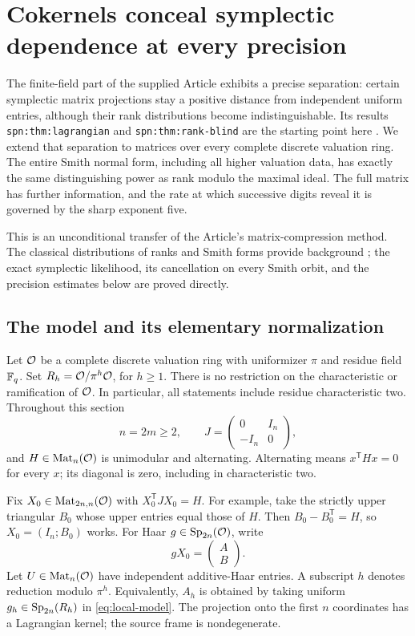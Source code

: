 \section{Cokernels conceal symplectic dependence at every precision}
\label{sec:local}

The finite-field part of the supplied Article exhibits a precise separation:
certain symplectic matrix projections stay a positive distance from independent
uniform entries, although their rank distributions become indistinguishable.
Its results \texttt{spn:thm:lagrangian} and
\texttt{spn:thm:rank-blind} are the starting point here
\cite{ProveItArticle}. We extend that separation to matrices over every complete
discrete valuation ring. The entire Smith normal form, including all higher
valuation data, has exactly the same distinguishing power as rank modulo the
maximal ideal. The full matrix has further information, and the rate at which
successive digits reveal it is governed by the sharp exponent five.

This is an unconditional transfer of the Article's matrix-compression method.
The classical distributions of ranks and Smith forms provide background
\cite{FulmanGoldstein,WangStanley}; the exact symplectic likelihood, its
cancellation on every Smith orbit, and the precision estimates below are
proved directly.

\subsection{The model and its elementary normalization}

Let \(\mathcal O\) be a complete discrete valuation ring with uniformizer \(\pi\) and
residue field \(\mathbb F_q\). Set \(R_h=\mathcal O/\pi^h\mathcal O\), for \(h\ge1\).
There is no restriction on the characteristic or ramification of \(\mathcal O\).
In particular, all statements include residue characteristic two.
Throughout this section
\[
 n=2m\ge2,\qquad
 J=\begin{pmatrix}0&I_n\\-I_n&0\end{pmatrix},
\]
and \(H\in\operatorname{Mat}_n(\mathcal O)\) is unimodular and alternating. Alternating means
\(x^{\mathsf T}Hx=0\) for every \(x\); its diagonal is zero, including in
characteristic two.

Fix \(X_0\in\operatorname{Mat}_{2n,n}(\mathcal O)\) with \(X_0^{\mathsf T}JX_0=H\).
For example, take the strictly upper triangular \(B_0\) whose upper entries
equal those of \(H\). Then \(B_0-B_0^{\mathsf T}=H\), so
\(X_0=(I_n;B_0)\) works. For Haar \(g\in\operatorname{Sp}_{2n}(\mathcal O)\), write
\[
 gX_0=\begin{pmatrix}A\\B\end{pmatrix}.
 \tag{L1}\label{eq:local-model}
\]
Let \(U\in\operatorname{Mat}_n(\mathcal O)\) have independent additive-Haar entries. A subscript
\(h\) denotes reduction modulo \(\pi^h\).
Equivalently, \(A_h\) is obtained by taking uniform
\(g_h\in\operatorname{Sp}_{2n}(R_h)\) in \eqref{eq:local-model}. The projection onto the
first \(n\) coordinates has a Lagrangian kernel; the source frame is
nondegenerate.


